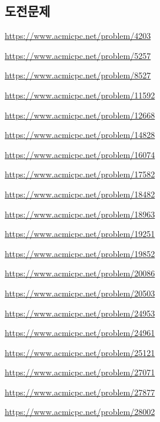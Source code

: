 \subsection{도전문제}
\begin{problem} \url{https://www.acmicpc.net/problem/4203} \end{problem}
\begin{problem} \url{https://www.acmicpc.net/problem/5257} \end{problem}
\begin{problem} \url{https://www.acmicpc.net/problem/8527} \end{problem}
\begin{problem} \url{https://www.acmicpc.net/problem/11592} \end{problem}
\begin{problem} \url{https://www.acmicpc.net/problem/12668} \end{problem}
\begin{problem} \url{https://www.acmicpc.net/problem/14828} \end{problem}
\begin{problem} \url{https://www.acmicpc.net/problem/16074} \end{problem}
\begin{problem} \url{https://www.acmicpc.net/problem/17582} \end{problem}
\begin{problem} \url{https://www.acmicpc.net/problem/18482} \end{problem}
\begin{problem} \url{https://www.acmicpc.net/problem/18963} \end{problem}
\begin{problem} \url{https://www.acmicpc.net/problem/19251} \end{problem}
\begin{problem} \url{https://www.acmicpc.net/problem/19852} \end{problem}
\begin{problem} \url{https://www.acmicpc.net/problem/20086} \end{problem}
\begin{problem} \url{https://www.acmicpc.net/problem/20503} \end{problem}
\begin{problem} \url{https://www.acmicpc.net/problem/24953} \end{problem}
\begin{problem} \url{https://www.acmicpc.net/problem/24961} \end{problem}
\begin{problem} \url{https://www.acmicpc.net/problem/25121} \end{problem}
\begin{problem} \url{https://www.acmicpc.net/problem/27071} \end{problem}
\begin{problem} \url{https://www.acmicpc.net/problem/27877} \end{problem}
\begin{problem} \url{https://www.acmicpc.net/problem/28002} \end{problem}
